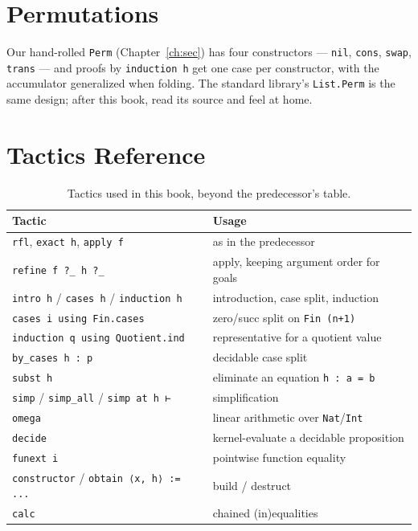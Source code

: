 \documentclass[12pt, a4paper, openright]{book}
\theoremstyle{thmstyle}
\theoremstyle{defstyle}
\newcommand{\lc}[1]{\texttt{#1}}
\begin{document}
\section{Permutations}

Our hand-rolled \lc{Perm} (Chapter~\ref{ch:sec}) has four constructors
--- \lc{nil}, \lc{cons}, \lc{swap}, \lc{trans} --- and proofs by
\lc{induction h} get one case per constructor, with the accumulator
generalized when folding. The standard library's \lc{List.Perm} is the
same design; after this book, read its source and feel at home.

\section{Tactics Reference}

\begin{table}[h]
  \centering
  \begin{tabular}{ll}
    \toprule
    Tactic & Usage \\
    \midrule
    \lc{rfl}, \lc{exact h}, \lc{apply f} & as in the predecessor \\
    \lc{refine f ?_ h ?_} & apply, keeping argument order for goals \\
    \lc{intro h} / \lc{cases h} / \lc{induction h} & introduction, case split, induction \\
    \lc{cases i using Fin.cases} & zero/succ split on \lc{Fin (n+1)} \\
    \lc{induction q using Quotient.ind} & representative for a quotient value \\
    \lc{by_cases h : p} & decidable case split \\
    \lc{subst h} & eliminate an equation \lc{h : a = b} \\
    \lc{simp} / \lc{simp_all} / \lc{simp at h ⊢} & simplification \\
    \lc{omega} & linear arithmetic over \lc{Nat}/\lc{Int} \\
    \lc{decide} & kernel-evaluate a decidable proposition \\
    \lc{funext i} & pointwise function equality \\
    \lc{constructor} / \lc{obtain ⟨x, h⟩ := ...} & build / destruct \\
    \lc{calc} & chained (in)equalities \\
    \bottomrule
  \end{tabular}
  \caption{Tactics used in this book, beyond the predecessor's table.}
\end{table}
\end{document}
